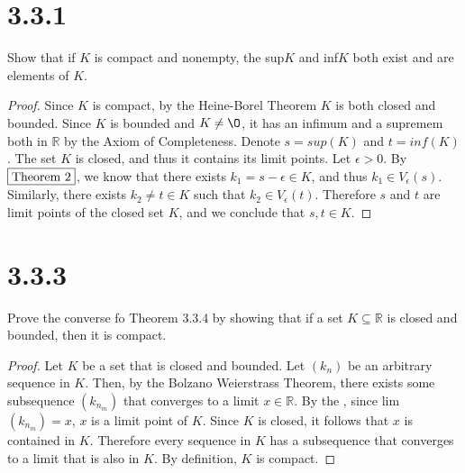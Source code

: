 \documentclass{article}
\begin{document}
\section*{3.3.1}
Show that if $K$ is compact and nonempty, the sup$K$ and inf$K$ both exist and are elements of $K$.

\begin{proof}
Since $K$ is compact, by the Heine-Borel Theorem $K$ is both closed and bounded. Since $K$ is bounded and $K \neq \O$, it has an infimum and a supremem both in $\mathbb{R}$ by the Axiom of Completeness. Denote $s = sup(K)$ and $t = inf(K)$. The set $K$ is closed, and thus it contains its limit points. Let $\epsilon > 0$. By $\fbox{Theorem 2}$, we know that there exists $k_1 = s - \epsilon \in K$, and thus $k _1 \in V_{\epsilon}(s)$. Similarly, there exists $k_2 \neq t \in K$ such that $k_2 \in V_{\epsilon}(t)$. Therefore $s$ and $t$ are limit points of the closed set $K$, and we conclude that $s,t \in K$. 

\end{proof}

\section*{3.3.3}
Prove the converse fo Theorem 3.3.4 by showing that if a set $K \subseteq \mathbb{R}$ is closed and bounded, then it is compact.

\begin{proof}
Let $K$ be a set that is closed and bounded. Let $(k_n)$ be an arbitrary sequence in $K$. Then, by the Bolzano Weierstrass Theorem, there exists some subsequence $(k_{n_m})$ that converges to a limit $x \in \mathbb{R}$. By the , since lim$(k_{n_m})=x$, $x$ is a limit point of $K$. Since $K$ is closed, it follows that $x$ is contained in $K$. Therefore every sequence in $K$ has a subsequence that converges to a limit that is also in $K$. By definition, $K$ is compact.

\end{proof}
\end{document}
